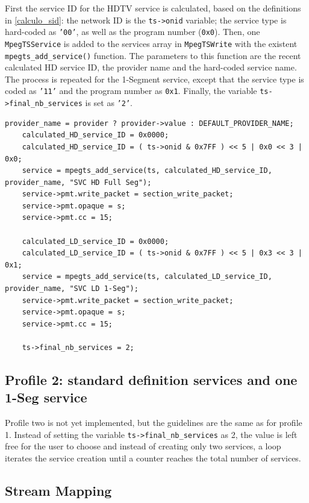 \documentclass[
	12pt,				%
	openright,			%
	twoside,			%
	a4paper,			%
	brazil,
	french,				%
	english
	]{abntex2}
\begin{document}
First the service ID for the HDTV service is calculated, based on the definitions in \autoref{calculo_sid}: the network ID is the \texttt{ts->onid} variable; the service type is hard-coded as \texttt{'00'}, as well as the program number (\texttt{0x0}). Then, one \texttt{MpegTSService} is added to the services array in \texttt{MpegTSWrite} with the existent \texttt{mpegts\_add\_service()} function. The parameters to this function are the recent calculated HD service ID, the provider name and the hard-coded service name. The process is repeated for the 1-Segment service, except that the service type is coded as \texttt{'11'} and the program number as \texttt{0x1}. Finally, the variable \texttt{ts->final\_nb\_services} is set as \texttt{'2'}.

\begin{lstlisting}[caption={}, label=[]
    provider_name = provider ? provider->value : DEFAULT_PROVIDER_NAME;
	calculated_HD_service_ID = 0x0000;
	calculated_HD_service_ID = ( ts->onid & 0x7FF ) << 5 | 0x0 << 3 | 0x0;
	service = mpegts_add_service(ts, calculated_HD_service_ID, provider_name, "SVC HD Full Seg");
	service->pmt.write_packet = section_write_packet;
	service->pmt.opaque = s;
	service->pmt.cc = 15;

	calculated_LD_service_ID = 0x0000;
	calculated_LD_service_ID = ( ts->onid & 0x7FF ) << 5 | 0x3 << 3 | 0x1;
	service = mpegts_add_service(ts, calculated_LD_service_ID, provider_name, "SVC LD 1-Seg");
	service->pmt.write_packet = section_write_packet;
	service->pmt.opaque = s;
	service->pmt.cc = 15;
	
	ts->final_nb_services = 2;
\end{lstlisting}

\subsection{Profile 2: standard definition services and one 1-Seg service}

Profile two is not yet implemented, but the guidelines are the same as for profile 1. Instead of setting the variable \texttt{ts->final\_nb\_services} as 2, the value is left free for the user to choose and instead of creating only two services, a loop iterates the service creation until a counter reaches the total number of services.

\subsection{Stream Mapping}
\end{document}
